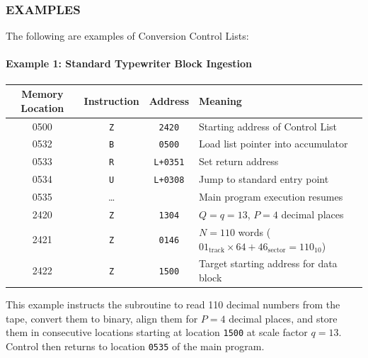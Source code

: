 \subsubsection*{EXAMPLES}
The following are examples of Conversion Control Lists:

\paragraph{Example 1: Standard Typewriter Block Ingestion}
\begin{table}[h!]
\centering
\begin{tabularx}{\textwidth}{cccX}
\toprule
\textbf{Memory Location} & \textbf{Instruction} & \textbf{Address} & \textbf{Meaning} \\
\midrule
    0500              & \texttt{Z}      & \texttt{2420}    & Starting address of Control List \\
    0532              & \texttt{B}      & \texttt{0500}    & Load list pointer into accumulator \\
    0533              & \texttt{R}      & \texttt{L+0351}  & Set return address \\
    0534              & \texttt{U}      & \texttt{L+0308}  & Jump to standard entry point \\
    0535              & \dots           &                  & Main program execution resumes \\
    \midrule
    2420              & \texttt{Z}      & \texttt{1304}    & $Q = \text{$q=13$}$, $P = 4$ decimal places \\
    2421              & \texttt{Z}      & \texttt{0146}    & $N = 110$ words ($01_{\text{track}} \times 64 + 46_{\text{sector}} = 110_{10}$) \\
2422              & \texttt{Z}      & \texttt{1500}    & Target starting address for data block \\
\bottomrule
\end{tabularx}
\end{table}
This example instructs the subroutine to read 110 decimal numbers from the tape, convert them to binary, align them for $P=4$ decimal places, and store them in consecutive locations starting at location \texttt{1500} at scale factor $q=13$. Control then returns to location \texttt{0535} of the main program.


